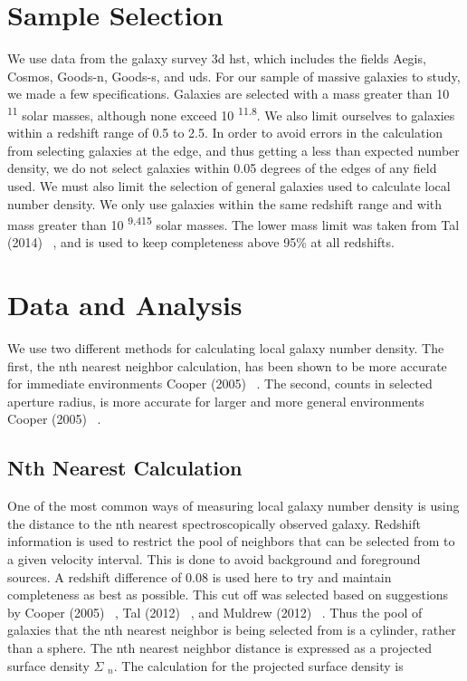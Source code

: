 \documentclass[apj]{emulateapj}
\begin{document}
\section{Sample Selection}

We use data from the galaxy survey 3d hst, which includes the fields Aegis, Cosmos, Goods-n, Goods-s, and uds. For our sample of massive galaxies to study, we made a few specifications. Galaxies are selected with a mass greater than 10 \textsuperscript{11} solar masses, although none exceed 10 \textsuperscript{11.8}. We also limit ourselves to galaxies within a redshift range of 0.5 to 2.5. In order to avoid errors in the calculation from selecting galaxies at the edge, and thus getting a less than expected number density, we do not select galaxies within 0.05 degrees of the edges of any field used.
We must also limit the selection of general galaxies used to calculate local number density. We only use galaxies within the same redshift range and with mass greater than 10 \textsuperscript{9,415} solar masses. The lower mass limit was taken from Tal (2014) ~\cite{2014ApJ...789..164T}, and is used to keep completeness above 95\% at all redshifts.

\section{Data and Analysis}

We use two different methods for calculating local galaxy number density. The first, the nth nearest neighbor calculation, has been shown to be more accurate for immediate environments Cooper (2005) ~\cite{2005ApJ...634..833C}. The second, counts in selected aperture radius, is more accurate for larger and more general environments Cooper (2005) ~\cite{2005ApJ...634..833C}.

\subsection{Nth Nearest Calculation}

One of the most common ways of measuring local galaxy number density is using the distance to the nth nearest spectroscopically observed galaxy. Redshift information is used to restrict the pool of neighbors that can be selected from to a given velocity interval. This is done to avoid background and foreground sources. A redshift difference of 0.08 is used here to try and maintain completeness as best as possible. This cut off was selected based on suggestions by Cooper (2005) ~\cite{2005ApJ...634..833C}, Tal (2012) ~\cite{2012ApJ...751L...5T}, and Muldrew (2012) ~\cite{2012MNRAS.419.2670M}. Thus the pool of galaxies that the nth nearest neighbor is being selected from is a cylinder, rather than a sphere. The nth nearest neighbor distance is expressed as a projected surface density $\Sigma$ $_{n}$. The calculation for the projected surface density is
\end{document}
